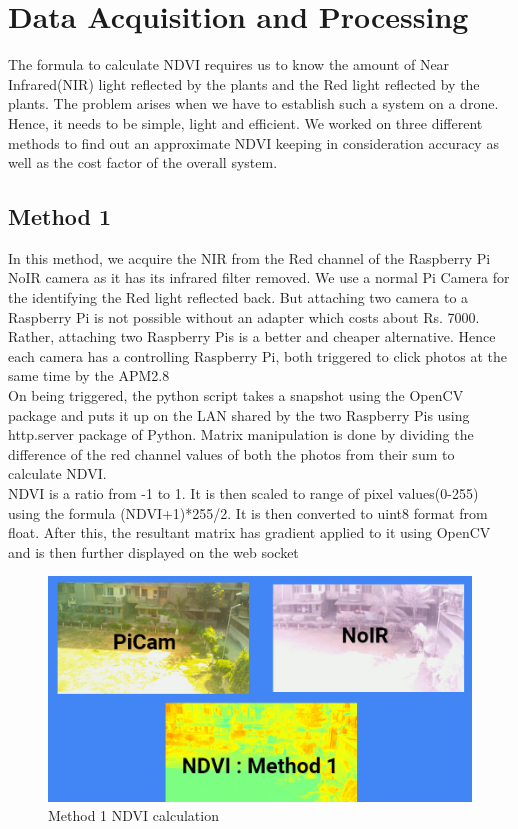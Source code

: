 \section{Data Acquisition and Processing}
The formula to calculate NDVI requires us to know the amount of Near Infrared(NIR) light reflected by the plants and the Red light reflected by the plants. The problem arises when we have to establish such a system on a drone. Hence, it needs to be simple, light and efficient. We worked on three different methods to find out an approximate NDVI keeping in consideration accuracy as well as the cost factor of the overall system.
\subsection{Method 1}
In this method, we acquire the NIR from the Red channel of the Raspberry Pi NoIR camera as it has its infrared filter removed. We use a normal Pi Camera for the identifying the Red light reflected back. But attaching two camera to a Raspberry Pi is not possible without an adapter which costs about Rs. 7000. Rather, attaching two Raspberry Pis is a better and cheaper alternative. Hence each camera has a controlling Raspberry Pi, both triggered to click photos at the same time by the APM2.8
\\
On being triggered, the python script takes a snapshot using the OpenCV package and puts it up on the LAN shared by the two Raspberry Pis using http.server package of Python. Matrix manipulation is done by dividing the difference of the red channel values of both the photos from their sum to calculate NDVI.
\\
NDVI is a ratio from -1 to 1. It is then scaled to range of pixel values(0-255) using the formula (NDVI+1)*255/2. It is then converted to uint8 format from float. After this, the resultant matrix has gradient applied to it using OpenCV and is then further displayed on the web socket

\begin{figure}[H]
    \centering
    \includegraphics[width=\linewidth]{SummerInterReport/project/Images-Major/ndvi_one.png}
    \caption{Method 1 NDVI calculation}
    \label{fig:compEy}
\end{figure}

